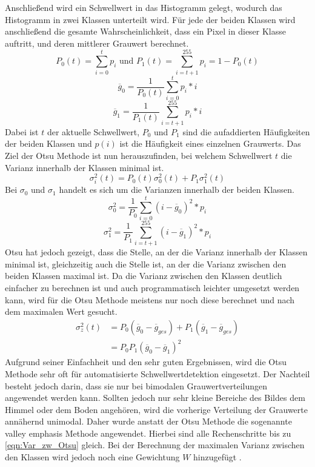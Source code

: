 \documentclass[12pt,a4paper,titlepage]{scrartcl}
\begin{document}
Anschließend wird ein Schwellwert in das Histogramm gelegt, wodurch das Histogramm in zwei Klassen unterteilt wird. Für jede der beiden Klassen wird anschließend die gesamte Wahrscheinlichkeit, dass ein Pixel in dieser Klasse auftritt, und deren mittlerer Grauwert berechnet.
\begin{equation}
P_0(t)=\sum_{i=0}^{t}p_i\text{ und }P_1(t)=\sum_{i=t+1}^{255}p_i=1-P_0(t)
\end{equation}
\begin{equation}
\overline{g}_0=\frac{1}{P_0(t)}\sum_{i=0}^{t}p_i*i
\end{equation}
\begin{equation}
\overline{g}_1=\frac{1}{P_1(t)}\sum_{i=t+1}^{255}p_i*i
\end{equation}
Dabei ist $t$ der aktuelle Schwellwert, $P_0$ und $P_1$ sind die aufaddierten Häufigkeiten der beiden Klassen und $p(i)$ ist die Häufigkeit eines einzelnen Grauwerts. Das Ziel der Otsu Methode ist nun herauszufinden, bei welchem Schwellwert $t$ die Varianz innerhalb der Klassen minimal ist.
\begin{equation}
\sigma_i^2(t)=P_0(t)\sigma_0^2(t) + P_1\sigma_1^2(t)
\end{equation}
Bei $\sigma_0$ und $\sigma_1$ handelt es sich um die Varianzen innerhalb der beiden Klassen. 
\begin{equation}
\sigma_0^2=\frac{1}{P_0}\sum_{i=0}^t(i-\overline{g}_0)^2*p_i
\end{equation}
\begin{equation}
\sigma_1^2=\frac{1}{P_1}\sum_{i=t+1}^{255}(i-\overline{g}_1)^2*p_i
\end{equation}
Otsu hat jedoch gezeigt, dass die Stelle, an der die Varianz innerhalb der Klassen minimal ist, gleichzeitig auch die Stelle ist, an der die Varianz zwischen den beiden Klassen maximal ist. Da die Varianz zwischen den Klassen deutlich einfacher zu berechnen ist und auch programmatisch leichter umgesetzt werden kann, wird für die Otsu Methode meistens nur noch diese berechnet und nach dem maximalen Wert gesucht.
\begin{align}
\sigma_z^2(t)&=P_0(\overline{g}_0-\overline{g}_{ges})+P_1(\overline{g}_1-\overline{g}_{ges})\nonumber\\
&=P_0P_1(\overline{g}_0-\overline{g}_1)^2
\label{eqn:Var_zw_Otsu}
\end{align}
Aufgrund seiner Einfachheit und den sehr guten Ergebnissen, wird die Otsu Methode sehr oft für automatisierte Schwellwertdetektion eingesetzt. Der Nachteil besteht jedoch darin, dass sie nur bei bimodalen Grauwertverteilungen angewendet werden kann. Sollten jedoch nur sehr kleine Bereiche des Bildes dem Himmel oder dem Boden angehören, wird die vorherige Verteilung der Grauwerte annähernd unimodal. Daher wurde anstatt der Otsu Methode die sogenannte valley emphasis Methode angewendet. Hierbei sind alle Rechenschritte bis zu \autoref{eqn:Var_zw_Otsu} gleich. Bei der Berechnung der maximalen Varianz zwischen den Klassen wird jedoch noch eine Gewichtung $W$ hinzugefügt \cite{ng2006automatic}.
\end{document}
